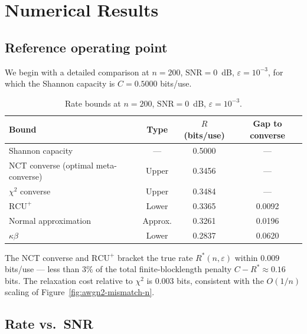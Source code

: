\section{Numerical Results}
\label{sec:awgn2-results}

\subsection{Reference operating point}

We begin with a detailed comparison at $n = 200$, $\mathrm{SNR} = 0$~dB, $\varepsilon = 10^{-3}$, for which the Shannon capacity is $C = 0.5000$ bits/use.

\begin{table}[ht]
\centering
\caption{Rate bounds at $n = 200$, $\mathrm{SNR} = 0$~dB, $\varepsilon = 10^{-3}$.}
\label{tab:awgn2-reference}
\begin{tabular}{lccc}
	\toprule
	Bound & Type & $R$ (bits/use) & Gap to converse \\
	\midrule
	Shannon capacity                                & ---     & 0.5000 & --- \\
	NCT converse (optimal meta-converse)            & Upper   & 0.3456 & --- \\
	$\chi^2$ converse~\cite{polyanskiy2010channel}  & Upper   & 0.3484 & --- \\
	$\mathrm{RCU}^+$                                & Lower   & 0.3365 & 0.0092 \\
	Normal approximation~\cite{polyanskiy2010channel} & Approx. & 0.3261 & 0.0196 \\
	$\kappa\beta$~\cite{polyanskiy2010channel}      & Lower   & 0.2837 & 0.0620 \\
	\bottomrule
\end{tabular}
\end{table}

The NCT converse and $\mathrm{RCU}^+$ bracket the true rate $R^*(n,\varepsilon)$ within $0.009$ bits/use --- less than $3\%$ of the total finite-blocklength penalty $C - R^* \approx 0.16$ bits.  The relaxation cost relative to $\chi^2$ is $0.003$ bits, consistent with the $O(1/n)$ scaling of Figure~\ref{fig:awgn2-mismatch-n}.

\subsection{Rate vs.\ SNR}

